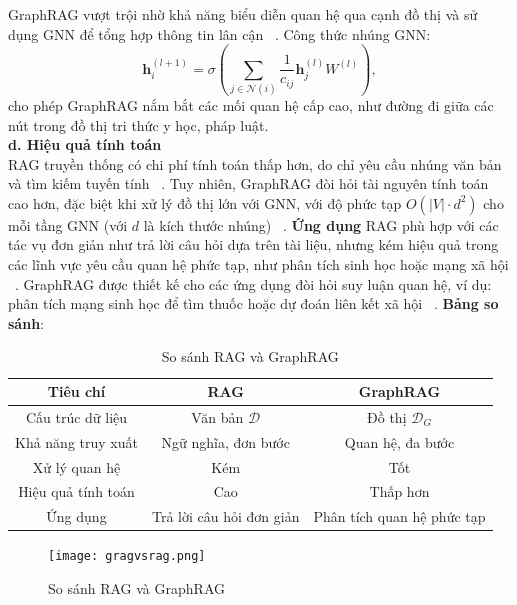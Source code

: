 \documentclass[a4paper]{article}
\begin{document}
GraphRAG vượt trội nhờ khả năng biểu diễn quan hệ qua cạnh đồ thị và sử dụng GNN để tổng hợp thông tin lân cận ~\cite{Wu2020GNN}. Công thức nhúng GNN:
\begin{equation}
    \mathbf{h}_i^{(l+1)} = \sigma \left( \sum_{j \in \mathcal{N}(i)} \frac{1}{c_{ij}} \mathbf{h}_j^{(l)} W^{(l)} \right),
\end{equation}
cho phép GraphRAG nắm bắt các mối quan hệ cấp cao, như đường đi giữa các nút trong đồ thị tri thức y học, pháp luật.\\
\textbf{d.  Hiệu quả tính toán\\}
RAG truyền thống có chi phí tính toán thấp hơn, do chỉ yêu cầu nhúng văn bản và tìm kiếm tuyến tính ~\cite{Karpukhin2020DPR}. Tuy nhiên, GraphRAG đòi hỏi tài nguyên tính toán cao hơn, đặc biệt khi xử lý đồ thị lớn với GNN, với độ phức tạp $O(|V| \cdot d^2)$ cho mỗi tầng GNN (với $d$ là kích thước nhúng) ~\cite{Wu2020GNN}.
\textbf{Ứng dụng} RAG phù hợp với các tác vụ đơn giản như trả lời câu hỏi dựa trên tài liệu, nhưng kém hiệu quả trong các lĩnh vực yêu cầu quan hệ phức tạp, như phân tích sinh học hoặc mạng xã hội ~\cite{Lewis2020RAG}. GraphRAG được thiết kế cho các ứng dụng đòi hỏi suy luận quan hệ, ví dụ: phân tích mạng sinh học để tìm thuốc hoặc dự đoán liên kết xã hội ~\cite{Chen2024GraphRAG}.
\textbf{Bảng so sánh}:
\begin{table}[H]
    \centering
    \begin{tabular}{|c|c|c|}
        \hline
        \textbf{Tiêu chí} & \textbf{RAG} & \textbf{GraphRAG} \\
        \hline
        Cấu trúc dữ liệu & Văn bản $\mathcal{D}$ & Đồ thị $\mathcal{D}_G$ \\
        Khả năng truy xuất & Ngữ nghĩa, đơn bước & Quan hệ, đa bước \\
        Xử lý quan hệ & Kém & Tốt \\
        Hiệu quả tính toán & Cao & Thấp hơn \\
        Ứng dụng & Trả lời câu hỏi đơn giản & Phân tích quan hệ phức tạp \\
        \hline
    \end{tabular}
    \caption{So sánh RAG và GraphRAG}
\end{table}

\begin{figure}[H]
    \centering
    \texttt{[image: gragvsrag.png]}
    \caption{So sánh RAG và GraphRAG}

\end{figure}
\end{document}

